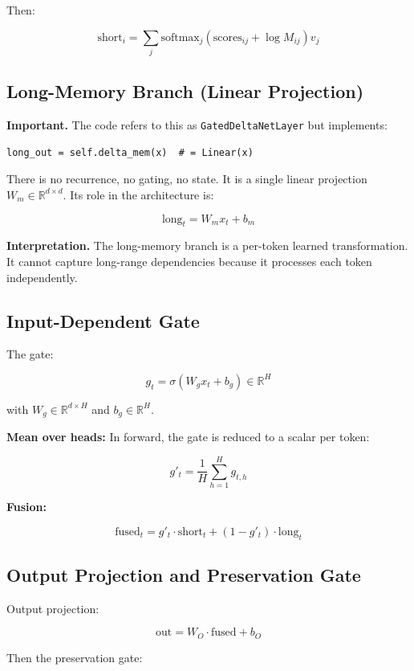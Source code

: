 Then:

\[
\text{short}_i = \sum_j \text{softmax}_j(\text{scores}_{ij} + \log M_{ij}) v_j
\tag{4.4}
\]

\subsection{Long-Memory Branch (Linear Projection)}

\textbf{Important.} The code refers to this as \texttt{GatedDeltaNetLayer} but 
implements:

\begin{lstlisting}
long_out = self.delta_mem(x)  # = Linear(x)
\end{lstlisting}

There is no recurrence, no gating, no state. It is a single linear 
projection $W_m \in \mathbb{R}^{d \times d}$. Its role in the architecture 
is:

\[
\text{long}_t = W_m x_t + b_m
\tag{4.5}
\]

\textbf{Interpretation.} The long-memory branch is a per-token learned 
transformation. It cannot capture long-range dependencies because it 
processes each token independently.

\subsection{Input-Dependent Gate}

The gate:

\[
g_t = \sigma(W_g x_t + b_g) \in \mathbb{R}^H
\tag{4.6}
\]

with $W_g \in \mathbb{R}^{d \times H}$ and $b_g \in \mathbb{R}^H$.

\textbf{Mean over heads:} In forward, the gate is reduced to a scalar per token:

\[
g'_t = \frac{1}{H} \sum_{h=1}^H g_{t,h}
\tag{4.7}
\]

\textbf{Fusion:}

\[
\text{fused}_t = g'_t \cdot \text{short}_t + (1 - g'_t) \cdot \text{long}_t
\tag{4.8}
\]

\subsection{Output Projection and Preservation Gate}

Output projection:

\[
\text{out} = W_O \cdot \text{fused} + b_O
\tag{4.9}
\]

Then the preservation gate:

